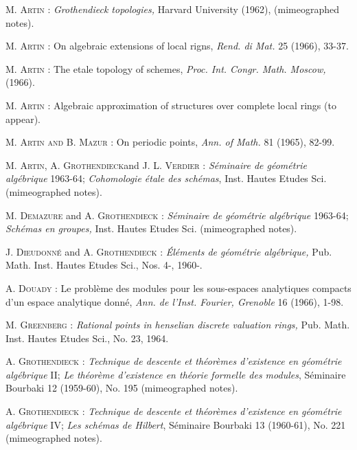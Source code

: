 \begin{thebibliography}{99}
 \textsc{M. Artin :} {\em Grothendieck topologies,} Harvard University (1962), (mimeographed notes).

 \textsc{M. Artin :} On algebraic extensions of local rigns, {\em Rend. di Mat.} 25 (1966), 33-37.

 \textsc{M. Artin :} The etale topology of schemes, {\em Proc. Int. Congr. Math. Moscow,} (1966).

 \textsc{M. Artin :} Algebraic approximation of structures over complete local rings (to appear).

 \textsc{M. Artin and B. Mazur :} On periodic points, {\em Ann. of Math.} 81 (1965), 82-99.

 \textsc{M. Artin, A. Grothendieck}\pageoriginale and \textsc{J. L. Verdier :} {\em S\'eminaire de g\'eom\'etrie alg\'ebrique} 1963-64; {\em Cohomologie \'etale des sch\'emas}, Inst. Hautes Etudes Sci. (mimeographed notes).

 \textsc{M. Demazure} and \textsc{A. Grothendieck :} {\em S\'eminaire de g\'eom\'etrie alg\'ebrique} 1963-64; {\em Sch\'emas en groupes,} Inst. Hautes Etudes Sci. (mimeographed notes).

 \textsc{J. Dieudonn\'e} and \textsc{A. Grothendieck :} {\em \'El\'ements de g\'eom\'etrie alg\'ebrique,} Pub. Math. Inst. Hautes Etudes Sci., Nos. 4-, 1960-.

 \textsc{A. Douady :} Le probl\`eme des modules pour les sous-espaces analytiques compacts d'un espace analytique donn\'e, {\em Ann. de l'Inst. Fourier, Grenoble} 16 (1966), 1-98.

 \textsc{M. Greenberg :} {\em Rational points in henselian discrete valuation rings,} Pub. Math. Inst. Hautes Etudes Sci., No. 23, 1964.

 \textsc{A. Grothendieck :} {\em Technique de descente et th\'eor\`emes d'existence en g\'eom\'etrie alg\'ebrique} II; {\em Le th\'eor\`eme d'existence en th\'eorie formelle des modules}, S\'eminaire Bourbaki 12 (1959-60), No. 195 (mimeographed notes). 

 \textsc{A. Grothendieck :} {\em Technique de descente et th\'eor\`emes d'existence en g\'eom\'etrie alg\'ebrique} IV; {\em Les sch\'emas de Hilbert}, S\'eminaire Bourbaki 13 (1960-61), No. 221 (mimeographed notes).


\end{thebibliography}
